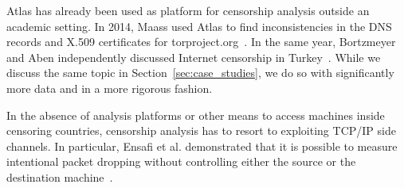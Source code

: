 Atlas has already been used as platform for censorship analysis outside an
academic setting.  In 2014, Maass used Atlas to find inconsistencies in the DNS
records and X.509 certificates for torproject.org~\cite{Maass2014}.  In the
same year, Bortzmeyer and Aben independently discussed Internet censorship in
Turkey~\cite{Bortzmeyer14,Aben14}.  While we discuss the same topic in
Section~\ref{sec:case_studies}, we do so with significantly more data and in a
more rigorous fashion.

In the absence of analysis platforms or other means to access machines inside
censoring countries, censorship analysis has to resort to exploiting TCP/IP
side channels.  In particular, Ensafi et al. demonstrated that it is possible
to measure intentional packet dropping without controlling either the source or
the destination machine~\cite{Ensafi2014}.
